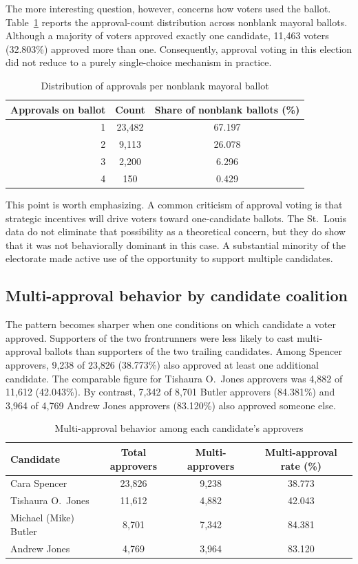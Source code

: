\documentclass[11pt]{article}
\begin{document}
The more interesting question, however, concerns how voters used the ballot. Table~\ref{tab:distribution} reports the approval-count distribution across nonblank mayoral ballots. Although a majority of voters approved exactly one candidate, 11,463 voters (32.803\%) approved more than one. Consequently, approval voting in this election did not reduce to a purely single-choice mechanism in practice.

\begin{table}[htbp]
\centering
\caption{Distribution of approvals per nonblank mayoral ballot}
\label{tab:distribution}
\begin{tabular}{rcc}
\toprule
Approvals on ballot & Count & Share of nonblank ballots (\%) \\
\midrule
1 & 23,482 & 67.197 \\
2 & 9,113 & 26.078 \\
3 & 2,200 & 6.296 \\
4 & 150 & 0.429 \\
\bottomrule
\end{tabular}
\end{table}

This point is worth emphasizing. A common criticism of approval voting is that strategic incentives will drive voters toward one-candidate ballots. The St.~Louis data do not eliminate that possibility as a theoretical concern, but they do show that it was not behaviorally dominant in this case. A substantial minority of the electorate made active use of the opportunity to support multiple candidates.

\subsection{Multi-approval behavior by candidate coalition}
The pattern becomes sharper when one conditions on which candidate a voter approved. Supporters of the two frontrunners were less likely to cast multi-approval ballots than supporters of the two trailing candidates. Among Spencer approvers, 9,238 of 23,826 (38.773\%) also approved at least one additional candidate. The comparable figure for Tishaura O.~Jones approvers was 4,882 of 11,612 (42.043\%). By contrast, 7,342 of 8,701 Butler approvers (84.381\%) and 3,964 of 4,769 Andrew Jones approvers (83.120\%) also approved someone else.

\begin{table}[htbp]
\centering
\caption{Multi-approval behavior among each candidate's approvers}
\label{tab:multiapproval}
\begin{tabular}{lccc}
\toprule
Candidate & Total approvers & Multi-approvers & Multi-approval rate (\%) \\
\midrule
Cara Spencer & 23,826 & 9,238 & 38.773 \\
Tishaura O.~Jones & 11,612 & 4,882 & 42.043 \\
Michael (Mike) Butler & 8,701 & 7,342 & 84.381 \\
Andrew Jones & 4,769 & 3,964 & 83.120 \\
\bottomrule
\end{tabular}
\end{table}
\end{document}

